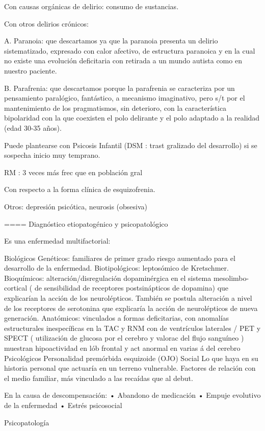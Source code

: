 \documentclass[encares.tex]{subfiles}
\begin{document}
Con causas orgánicas de delirio: consumo de sustancias.

Con otros delirios crónicos:

A. Paranoia: que descartamos ya que la paranoia presenta un delirio sistematizado, expresado con calor afectivo, de estructura paranoica y en la cual no existe una evolución deficitaria con retirada a un mundo autista como en nuestro paciente.

B. Parafrenia: que descartamos porque la parafrenia se caracteriza por un pensamiento paralógico, fantástico, a mecanismo imaginativo, pero s/t por el mantenimiento de los pragmatismos, sin deterioro, con la característica bipolaridad con la que coexisten el polo delirante y el polo adaptado a la realidad (edad 30-35 años).

Puede plantearse con Psicosis Infantil (DSM : trast gralizado del desarrollo) si se sospecha inicio muy temprano.

RM : 3 veces más frec que en población gral

Con respecto a la forma clínica de esquizofrenia.

Otros: depresión psicótica, neurosis (obsesiva)

==== Diagnóstico etiopatogénico y psicopatológico

Es una enfermedad multifactorial:

Biológicos Genéticos: familiares de primer grado riesgo aumentado para el desarrollo de la enfermedad. Biotipológicos: leptosómico de Kretschmer. Bioquímicos: alteración/disregulación dopaminérgica en el sistema mesolimbo-cortical ( de sensibilidad de receptores postsinápticos de dopamina) que explicarían la acción de los neurolépticos. También se postula alteración a nivel de los receptores de serotonina que explicaría la acción de neurolépticos de nueva generación. Anatómicos: vinculados a formas deficitarias, con anomalías estructurales inespecíficas en la TAC y RNM con de ventrículos laterales / PET y SPECT ( utilización de glucosa por el cerebro y valorac del flujo sanguíneo ) muestran hipoactividad en lób frontal y act anormal en varias á del cerebro Psicológicos Personalidad premórbida esquizoide (OJO) Social Lo que haya en su historia personal que actuaría en un terreno vulnerable. Factores de relación con el medio familiar, más vinculado a las recaídas que al debut.

En la causa de descompensación: • Abandono de medicación • Empuje evolutivo de la enfermedad • Estrés psicosocial

Psicopatología
\end{document}
